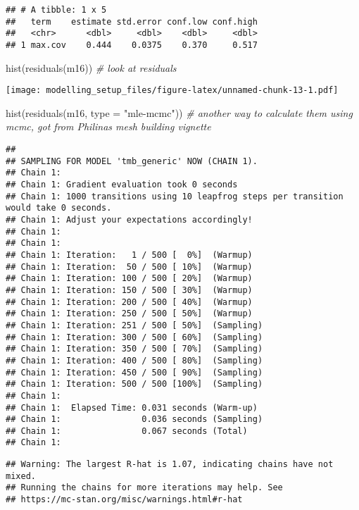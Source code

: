 \documentclass[
]{article}
\newenvironment{Shaded}{\begin{snugshade}}{\end{snugshade}}
\newcommand{\AttributeTok}[1]{\textcolor[rgb]{0.77,0.63,0.00}{#1}}
\newcommand{\CommentTok}[1]{\textcolor[rgb]{0.56,0.35,0.01}{\textit{#1}}}
\newcommand{\FunctionTok}[1]{\textcolor[rgb]{0.00,0.00,0.00}{#1}}
\newcommand{\NormalTok}[1]{#1}
\newcommand{\StringTok}[1]{\textcolor[rgb]{0.31,0.60,0.02}{#1}}
\begin{document}
\begin{verbatim}
## # A tibble: 1 x 5
##   term    estimate std.error conf.low conf.high
##   <chr>      <dbl>     <dbl>    <dbl>     <dbl>
## 1 max.cov    0.444    0.0375    0.370     0.517
\end{verbatim}

\begin{Shaded}
\begin{Highlighting}[]
\FunctionTok{hist}\NormalTok{(}\FunctionTok{residuals}\NormalTok{(m16)) }\CommentTok{\# look  at residuals}
\end{Highlighting}
\end{Shaded}

\texttt{[image: modelling\_setup\_files/figure-latex/unnamed-chunk-13-1.pdf]}

\begin{Shaded}
\begin{Highlighting}[]
\FunctionTok{hist}\NormalTok{(}\FunctionTok{residuals}\NormalTok{(m16, }\AttributeTok{type =} \StringTok{"mle{-}mcmc"}\NormalTok{)) }\CommentTok{\# another way to calculate them using mcmc, got from Philina\textquotesingle{}s mesh building vignette}
\end{Highlighting}
\end{Shaded}

\begin{verbatim}
## 
## SAMPLING FOR MODEL 'tmb_generic' NOW (CHAIN 1).
## Chain 1: 
## Chain 1: Gradient evaluation took 0 seconds
## Chain 1: 1000 transitions using 10 leapfrog steps per transition would take 0 seconds.
## Chain 1: Adjust your expectations accordingly!
## Chain 1: 
## Chain 1: 
## Chain 1: Iteration:   1 / 500 [  0%]  (Warmup)
## Chain 1: Iteration:  50 / 500 [ 10%]  (Warmup)
## Chain 1: Iteration: 100 / 500 [ 20%]  (Warmup)
## Chain 1: Iteration: 150 / 500 [ 30%]  (Warmup)
## Chain 1: Iteration: 200 / 500 [ 40%]  (Warmup)
## Chain 1: Iteration: 250 / 500 [ 50%]  (Warmup)
## Chain 1: Iteration: 251 / 500 [ 50%]  (Sampling)
## Chain 1: Iteration: 300 / 500 [ 60%]  (Sampling)
## Chain 1: Iteration: 350 / 500 [ 70%]  (Sampling)
## Chain 1: Iteration: 400 / 500 [ 80%]  (Sampling)
## Chain 1: Iteration: 450 / 500 [ 90%]  (Sampling)
## Chain 1: Iteration: 500 / 500 [100%]  (Sampling)
## Chain 1: 
## Chain 1:  Elapsed Time: 0.031 seconds (Warm-up)
## Chain 1:                0.036 seconds (Sampling)
## Chain 1:                0.067 seconds (Total)
## Chain 1:
\end{verbatim}

\begin{verbatim}
## Warning: The largest R-hat is 1.07, indicating chains have not mixed.
## Running the chains for more iterations may help. See
## https://mc-stan.org/misc/warnings.html#r-hat
\end{verbatim}
\end{document}
